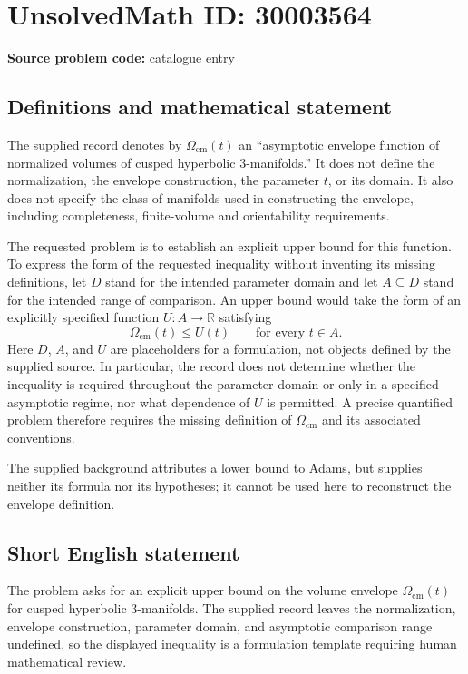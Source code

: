 \documentclass[11pt]{article}
\newcommand{\R}{\mathbb{R}}
\begin{document}
\section*{UnsolvedMath ID: 30003564}
\textbf{Source problem code:} catalogue entry
\subsection{Definitions and mathematical statement}
The supplied record denotes by \(\Omega_{\mathrm{cm}}(t)\) an ``asymptotic envelope function of normalized volumes of cusped hyperbolic \(3\)-manifolds.'' It does not define the normalization, the envelope construction, the parameter \(t\), or its domain. It also does not specify the class of manifolds used in constructing the envelope, including completeness, finite-volume and orientability requirements.

The requested problem is to establish an explicit upper bound for this function. To express the form of the requested inequality without inventing its missing definitions, let \(D\) stand for the intended parameter domain and let \(A\subseteq D\) stand for the intended range of comparison. An upper bound would take the form of an explicitly specified function \(U\colon A\to\R\) satisfying
\[
\Omega_{\mathrm{cm}}(t)\leq U(t)\qquad\text{for every }t\in A.
\]
Here \(D\), \(A\), and \(U\) are placeholders for a formulation, not objects defined by the supplied source. In particular, the record does not determine whether the inequality is required throughout the parameter domain or only in a specified asymptotic regime, nor what dependence of \(U\) is permitted. A precise quantified problem therefore requires the missing definition of \(\Omega_{\mathrm{cm}}\) and its associated conventions.

The supplied background attributes a lower bound to Adams, but supplies neither its formula nor its hypotheses; it cannot be used here to reconstruct the envelope definition.
\subsection{Short English statement}
The problem asks for an explicit upper bound on the volume envelope \(\Omega_{\mathrm{cm}}(t)\) for cusped hyperbolic \(3\)-manifolds. The supplied record leaves the normalization, envelope construction, parameter domain, and asymptotic comparison range undefined, so the displayed inequality is a formulation template requiring human mathematical review.
\end{document}
